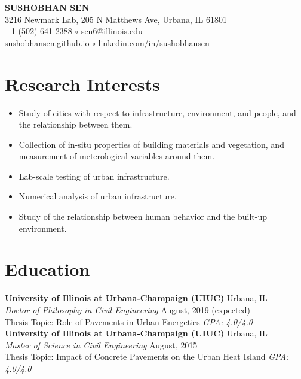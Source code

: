 \documentclass[12pt]{article}
\begin{document}
 \sloppy %
\begin{center}
{\large \uppercase{\textbf{Sushobhan Sen}}} \\
3216 Newmark Lab, 205 N Matthews Ave, Urbana, IL 61801 \\
+1-(502)-641-2388 $\circ$ \href{mailto:sen6@illinois.edu}{sen6@illinois.edu} \\
\href{http://sushobhansen.github.io/}{sushobhansen.github.io} $\circ$ \href{http://linkedin.com/in/sushobhansen}{linkedin.com/in/sushobhansen}
\end{center} 

\hfill \break %
\section*{Research Interests}
\begin{itemize}
	\item Study of cities with respect to infrastructure, environment, and people, and the relationship between them.
	\item Collection of in-situ properties of building materials and vegetation, and measurement of meterological variables around them. 
	\item Lab-scale testing of urban infrastructure.
	\item Numerical analysis of urban infrastructure. 
	\item Study of the relationship between human behavior and the built-up environment.
\end{itemize}
 

\section*{Education}
\textbf{University of Illinois at Urbana-Champaign (UIUC)} \hfill Urbana, IL\\
\textit{Doctor of Philosophy in Civil Engineering} \hfill August, 2019 (expected)\\
Thesis Topic: Role of Pavements in Urban Energetics \hfill \textit{GPA: 4.0/4.0} \\

\textbf{University of Illinois at Urbana-Champaign (UIUC)} \hfill Urbana, IL\\
\textit{Master of Science in Civil Engineering} \hfill August, 2015\\
Thesis Topic: Impact of Concrete Pavements on the Urban Heat Island \hfill \textit{GPA: 4.0/4.0} \\
\end{document}
